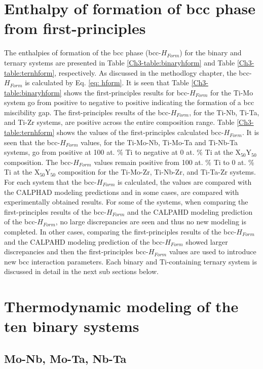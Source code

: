 \section{Enthalpy of formation of bcc phase from first-principles}

The enthalpies of formation of the bcc phase (bcc-$H_{Form}$) for the binary and ternary systems are presented in Table \ref{Ch3-table:binaryhform} and Table \ref{Ch3-table:ternhform}, respectively. As discussed in the methodlogy chapter, the bcc-$H_{Form}$ is calculated by Eq. \ref{eq: hform}. It is seen that Table \ref{Ch3-table:binaryhform} shows the first-principles results for bcc-$H_{Form}$ for the Ti-Mo system go from positive to negative to positive indicating the formation of a bcc miscibility gap. The first-principles results of the bcc-$H_{Form}$, for the Ti-Nb, Ti-Ta, and Ti-Zr systems, are positive across the entire composition range. Table \ref{Ch3-table:ternhform} shows the values of the first-principles calculated bcc-$H_{Form}$.  It is seen that the bcc-$H_{Form}$ values, for the Ti-Mo-Nb, Ti-Mo-Ta and Ti-Nb-Ta systems, go from positive at 100 at. \% Ti to negative at 0 at. \% Ti at the X$_{50}$Y$_{50}$ composition. The bcc-$H_{Form}$ values remain positive from 100 at. \% Ti to 0 at. \% Ti at the X$_{50}$Y$_{50}$ composition for the Ti-Mo-Zr, Ti-Nb-Zr, and Ti-Ta-Zr systems. For each system that the bcc-$H_{Form}$ is calculated, the values are compared with the CALPHAD modeling predictions and in some cases, are compared with experimentally obtained results. For some of the systems, when comparing the first-principles results of the bcc-$H_{Form}$ and the CALPAHD modeling prediction of the bcc-$H_{Form}$, no large discrepancies are seen and thus no new modeling is completed. In other cases, comparing the first-principles results of the bcc-$H_{Form}$ and the CALPAHD modeling prediction of the bcc-$H_{Form}$ showed larger discrepancies and then the first-principles bcc-$H_{Form}$ values are used to introduce new bcc interaction parameters. Each binary and Ti-containing ternary system is discussed in detail in the next sub sections below.

\section{Thermodynamic modeling of the ten binary systems}

\subsection{Mo-Nb, Mo-Ta, Nb-Ta}

